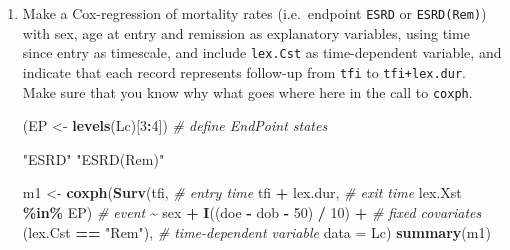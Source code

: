 \documentclass[
]{book}
\newenvironment{Shaded}{\begin{snugshade}}{\end{snugshade}}
\newcommand{\AttributeTok}[1]{\textcolor[rgb]{0.13,0.29,0.53}{#1}}
\newcommand{\CommentTok}[1]{\textcolor[rgb]{0.56,0.35,0.01}{\textit{#1}}}
\newcommand{\ConstantTok}[1]{\textcolor[rgb]{0.56,0.35,0.01}{#1}}
\newcommand{\DecValTok}[1]{\textcolor[rgb]{0.00,0.00,0.81}{#1}}
\newcommand{\FunctionTok}[1]{\textcolor[rgb]{0.13,0.29,0.53}{\textbf{#1}}}
\newcommand{\NormalTok}[1]{#1}
\newcommand{\OtherTok}[1]{\textcolor[rgb]{0.56,0.35,0.01}{#1}}
\newcommand{\SpecialCharTok}[1]{\textcolor[rgb]{0.81,0.36,0.00}{\textbf{#1}}}
\newcommand{\StringTok}[1]{\textcolor[rgb]{0.31,0.60,0.02}{#1}}
\begin{document}
\begin{enumerate}
\begin{Shaded}
\end{Shaded}
\item
  Make a Cox-regression of mortality rates (i.e.~endpoint \texttt{ESRD} or
  \texttt{ESRD(Rem)}) with sex, age at entry and remission as
  explanatory variables, using time since entry as timescale, and
  include \texttt{lex.Cst} as time-dependent variable, and
  indicate that each record represents follow-up from
  \texttt{tfi} to \texttt{tfi+lex.dur}. Make sure that you know
  why what goes where here in the call to \texttt{coxph}.

\begin{Shaded}
\begin{Highlighting}[]
\NormalTok{(EP }\OtherTok{\textless{}{-}} \FunctionTok{levels}\NormalTok{(Lc)[}\DecValTok{3}\SpecialCharTok{:}\DecValTok{4}\NormalTok{])           }\CommentTok{\# define EndPoint states}
\end{Highlighting}
\end{Shaded}

\begin{Shaded}
\begin{Highlighting}[]
\NormalTok{[1] "ESRD"      "ESRD(Rem)"}
\end{Highlighting}
\end{Shaded}

\begin{Shaded}
\begin{Highlighting}[]
\NormalTok{m1 }\OtherTok{\textless{}{-}} \FunctionTok{coxph}\NormalTok{(}\FunctionTok{Surv}\NormalTok{(tfi,             }\CommentTok{\# entry time}
\NormalTok{                 tfi }\SpecialCharTok{+}\NormalTok{ lex.dur,   }\CommentTok{\# exit time}
\NormalTok{                 lex.Xst }\SpecialCharTok{\%in\%}\NormalTok{ EP) }\CommentTok{\# event}
            \SpecialCharTok{\textasciitilde{}}\NormalTok{ sex }\SpecialCharTok{+} \FunctionTok{I}\NormalTok{((doe }\SpecialCharTok{{-}}\NormalTok{ dob }\SpecialCharTok{{-}} \DecValTok{50}\NormalTok{) }\SpecialCharTok{/} \DecValTok{10}\NormalTok{) }\SpecialCharTok{+} \CommentTok{\# fixed covariates}
\NormalTok{              (lex.Cst }\SpecialCharTok{==} \StringTok{"Rem"}\NormalTok{),              }\CommentTok{\# time{-}dependent variable}
            \AttributeTok{data =}\NormalTok{ Lc)}
\FunctionTok{summary}\NormalTok{(m1)}
\end{Highlighting}
\end{Shaded}


\end{enumerate}
\end{document}
